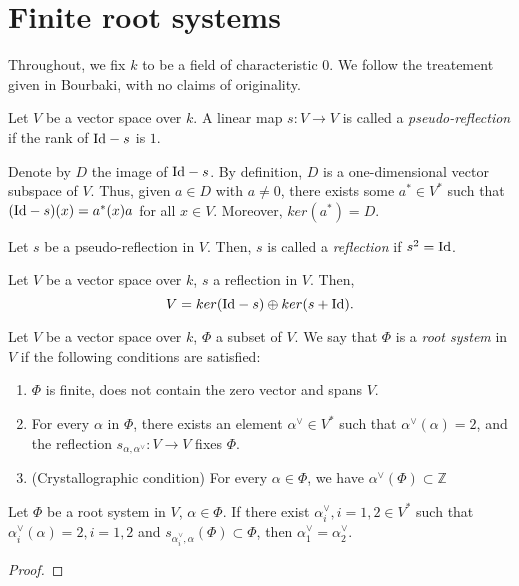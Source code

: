 \section{Finite root systems}
\label{sec:finite-root-systems}

Throughout, we fix $k$ to be a field of characteristic $0$. We follow the treatement given in Bourbaki, 
with no claims of originality.

\begin{definition}
    Let $V$ be a vector space over $k$. A linear map $s : V \to V$ is called a {\it pseudo-reflection} if 
    the rank of ${\rm Id}-s$ is $1$. 
\end{definition}
Denote by $D$ the image of ${\rm Id}-s$. By definition, $D$ is a one-dimensional vector subspace of $V$. 
Thus, given $a \in D$ with $a \neq 0$, there exists some $a^* \in V^*$ such that $({\rm Id}-s)(x)= a^*(x) a$ for 
all $x \in V$. Moreover, $ker(a^*) = D$.

\begin{definition}
    Let $s$ be a pseudo-reflection in $V$. Then, $s$ is called a {\it reflection} if $s^2 = {\rm Id}$.
\end{definition}

\begin{lemma}
    Let $V$ be a vector space over $k$, $s$ a reflection in $V$. Then, 
    \[
        V = ker({\rm Id}-s) \oplus ker(s+{\rm Id}).
    \]
\end{lemma}

\begin{definition}
  \label{def:root-system}
  Let $V$ be a vector space over $k$, $\Phi$ a subset of $V$. We say that $\Phi$ is a 
  \emph{root system} in $V$ if the following conditions are satisfied:
    \begin{enumerate}
        \item $\Phi$ is finite, does not contain the zero vector and spans $V$.
        \item For every $\alpha$ in $\Phi$, there exists an element $\alpha^\vee \in V^*$ such that 
            $\alpha^\vee(\alpha) = 2$, and the reflection $s_{\alpha,\alpha^\vee}: V \to V$ fixes $\Phi$.
        \item (Crystallographic condition) For every $\alpha\in \Phi$, we have $\alpha^\vee(\Phi) \subset \mathbb{Z}$
    \end{enumerate}
\end{definition}

\begin{lemma}
   Let $\Phi$ be a root system in $V$, $\alpha \in \Phi$. If there exist $\alpha_i^\vee,i=1,2 \in V^*$ such that
    $\alpha_i^\vee(\alpha) =  2, i=1,2$ and $s_{\alpha_i^\vee,\alpha}(\Phi) \subset \Phi$,
     then $\alpha_1^\vee = \alpha_2^\vee$.
\end{lemma}
\begin{proof}

\end{proof}
